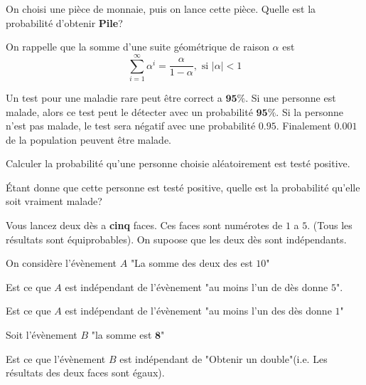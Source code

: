 \documentclass[11pt,largemargins]{homework}
\begin{document}
\begin{arabicparts}
    \item On choisi une pièce de monnaie, puis on lance cette pièce. Quelle est
        la probabilité d'obtenir \textbf{Pile}?


        On rappelle que la somme d'une suite géométrique de raison $\alpha$ est 
        \begin{equation*}
            \sum_{i=1}^\infty \alpha^i = \frac{\alpha}{1 - \alpha}, \text{ si }
            \vert \alpha \vert < 1
        \end{equation*}
\end{arabicparts}
Un test pour une maladie rare peut être correct a $\mathbf{95\%}$. Si une personne est
malade, alors ce test peut le détecter  avec un probabilité $\mathbf{95\%}$. Si
la personne n'est pas malade, le test sera négatif avec une probabilité
$\mathbf{0.95}$. Finalement $\mathbf{0.001}$ de la population peuvent être malade.

\begin{arabicparts}
    \item Calculer la probabilité qu'une personne  choisie aléatoirement est testé positive.
    \item Étant donne que cette personne est testé positive, quelle est la
        probabilité qu'elle soit vraiment malade?
\end{arabicparts}

Vous lancez deux dès a \textbf{cinq} faces. Ces faces sont numérotes de $1$ a
$5$. (Tous les résultats sont équiprobables). On supoose que les deux dès sont
indépendants.

\begin{arabicparts}
    \item On considère l'évènement $A$ "La somme des deux des est $10$"
        \begin{arabicparts}
            \item Est ce que $A$ est indépendant de l'évènement "au moins l'un
                de dès donne $5$".
            \item Est ce que $A$ est indépendant de l'évènement "au moins l'un
                des dès donne $1$"
        \end{arabicparts}
    \item Soit l'évènement $B$ "la somme est $\mathbf{8}$"
        \begin{arabicparts}
            \item Est ce que l'évènement $B$ est indépendant de "Obtenir un
                double"(i.e. Les résultats des deux faces sont égaux).
        \end{arabicparts}

\end{arabicparts}
\end{document}
